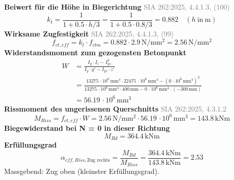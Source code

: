 \documentclass[11pt,a4paper]{article}
\newcommand{\normref}[1]{{\small\textcolor{gray}{#1}}}
\begin{document}
\noindent\textbf{Beiwert für die Höhe in Biegerichtung} \hfill \normref{SIA 262:2025, 4.4.1.3, (100)}
\begin{equation*}
k_t = \frac{1}{1 + 0.5 \cdot h/3} = \frac{1}{1 + 0.5 \cdot 0.8/3} = 0.882 \quad \left(h\ \text{in}\ \mathrm{m}\right)
\end{equation*}
\noindent\textbf{Wirksame Zugfestigkeit} \hfill \normref{SIA 262:2025, 4.4.1.3, (99)}
\begin{equation*}
f_{ct,eff} = k_t \cdot f_{ctm} = 0.882 \cdot 2.9\,\mathrm{N}/\mathrm{mm}^{2} = 2.56\,\mathrm{N}/\mathrm{mm}^{2}
\end{equation*}
\noindent\textbf{Widerstandsmoment zum gezogensten Betonpunkt}
\begin{equation*}
\begin{aligned}
  W &= \frac{I_y \cdot I_z - I_{yz}^{2}}{I_y \cdot y' - I_{yz} \cdot z'} \\
  &= \frac{13275\,\cdot 10^{6}\,\mathrm{mm}^{4} \cdot 22475\,\cdot 10^{6}\,\mathrm{mm}^{4} - \left(0\,\cdot 10^{6}\,\mathrm{mm}^{4}\right)^{2}}{13275\,\cdot 10^{6}\,\mathrm{mm}^{4} \cdot 400\,\mathrm{mm} - 0\,\cdot 10^{6}\,\mathrm{mm}^{4} \cdot \left(-300\,\mathrm{mm}\right)} \\
  &= 56.19\,\cdot 10^{6}\,\mathrm{mm}^{3}
\end{aligned}
\end{equation*}
\noindent\textbf{Rissmoment des ungerissenen Querschnitts} \hfill \normref{SIA 262:2025, 4.3.1.2}
\begin{equation*}
M_{Riss} = f_{ct,eff} \cdot W = 2.56\,\mathrm{N}/\mathrm{mm}^{2} \cdot 56.19\,\cdot 10^{6}\,\mathrm{mm}^{3} = 143.8\,\mathrm{kNm}
\end{equation*}
\noindent\textbf{Biegewiderstand bei N = 0 in dieser Richtung}
\begin{equation*}
M_{Rd} = 364.4\,\mathrm{kNm}
\end{equation*}
\noindent\textbf{Erfüllungsgrad}
\begin{equation*}
\alpha_{eff,Riss,\text{Zug rechts}} = \frac{M_{Rd}}{M_{Riss}} = \frac{364.4\,\mathrm{kNm}}{143.8\,\mathrm{kNm}} = 2.53
\end{equation*}
Massgebend: Zug oben (kleinster Erfüllungsgrad).
\end{document}
